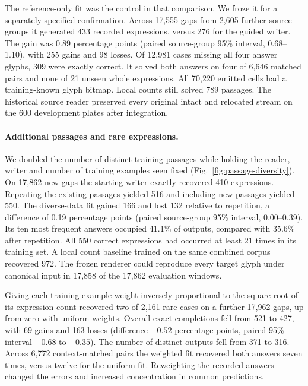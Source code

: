 \documentclass[12pt,a4paper]{article}
\providecommand{\DIFadd}[1]{{\protect\color{blue} \sf #1}} %
\begin{document}
\DIFadd{The reference-only fit was the control in that comparison. We froze it for a separately specified confirmation. Across 17,555 gaps from 2,605 further source groups it generated 433 recorded expressions, versus 276 for the guided writer. The gain was 0.89 percentage points (paired source-group 95\% interval, 0.68--1.10), with 255 gains and 98 losses. Of 12,981 cases missing all four answer glyphs, 309 were exactly correct. It solved both answers on four of 6,646 matched pairs and none of 21 unseen whole expressions. All 70,220 emitted cells had a training-known glyph bitmap. Local counts still solved 789 passages. The historical source reader preserved every original intact and relocated stream on the 600 development plates after integration.
}

\paragraph{\DIFadd{Additional passages and rare expressions.}}
\DIFadd{We doubled the number of distinct training passages while holding the reader, writer and number of training examples seen fixed (Fig.~\ref{fig:passage-diversity}). On 17,862 new gaps the starting writer exactly recovered 410 expressions. Repeating the existing passages yielded 516 and including new passages yielded 550. The diverse-data fit gained 166 and lost 132 relative to repetition, a difference of 0.19 percentage points (paired source-group 95\% interval, 0.00--0.39). Its ten most frequent answers occupied 41.1\% of outputs, compared with 35.6\% after repetition. All 550 correct expressions had occurred at least 21 times in its training set. A local count baseline trained on the same combined corpus recovered 972. The frozen renderer could reproduce every target glyph under canonical input in 17,858 of the 17,862 evaluation windows.
}

\DIFadd{Giving each training example weight inversely proportional to the square root of its expression count recovered two of 2,161 rare cases on a further 17,962 gaps, up from zero with uniform weights. Overall exact completions fell from 521 to 427, with 69 gains and 163 losses (difference $-0.52$ percentage points, paired 95\% interval $-0.68$ to $-0.35$). The number of distinct outputs fell from 371 to 316. Across 6,772 context-matched pairs the weighted fit recovered both answers seven times, versus twelve for the uniform fit. Reweighting the recorded answers changed the errors and increased concentration in common predictions.
}
\end{document}
